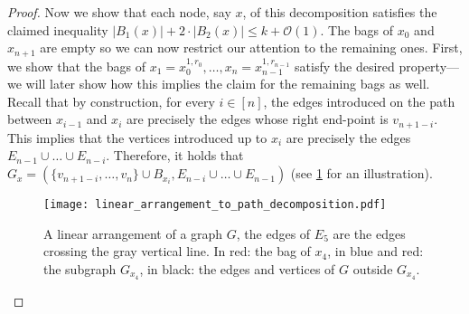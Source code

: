 \documentclass[a4paper,UKenglish,cleveref, autoref, thm-restate]{lipics-v2021}
\begin{document}
\begin{proof}
	Now we show that each node, say $x$, of this decomposition satisfies the claimed inequality $|B_1(x)| + 2 \cdot |B_2(x)| \leq k+\mathcal{O}(1)$. 
	The bags of $x_0$ and $x_{n+1}$ are empty so we can now restrict our attention to the remaining ones.
	First, we show that the bags of $x_1 = x_0^{1,r_0}, \dots, x_n = x_{n-1}^{1,r_{n-1}}$ satisfy the desired property---we will later show how this implies the claim for the remaining bags as well. 
	Recall that by construction, for every $i \in [n]$, the edges introduced on the path between $x_{i-1}$ and $x_i$ are precisely the edges whose right end-point is $v_{n+1-i}$.
	This implies that the vertices introduced up to $x_i$ are precisely the edges $E_{n-1} \cup \dots \cup E_{n-i}$.
	Therefore, it holds that $G_x = (\{v_{n+1-i}, \dots, v_n\} \cup B_{x_i}, E_{n-i} \cup \dots \cup E_{n-1})$ (see \cref{fig:lin-arr-to-pd} for an illustration).
	
	\begin{figure}[t]
        \centering
        \texttt{[image: linear\_arrangement\_to\_path\_decomposition.pdf]}
        \caption{A linear arrangement of a graph $G$, the edges of $E_5$ are the edges crossing the gray vertical line. In red: the bag of $x_4$, in blue and red: the subgraph $G_{x_4}$, in black: the edges and vertices of $G$ outside $G_{x_4}$.}
        \label{fig:lin-arr-to-pd}
    \end{figure}
	

\end{proof}
\end{document}
